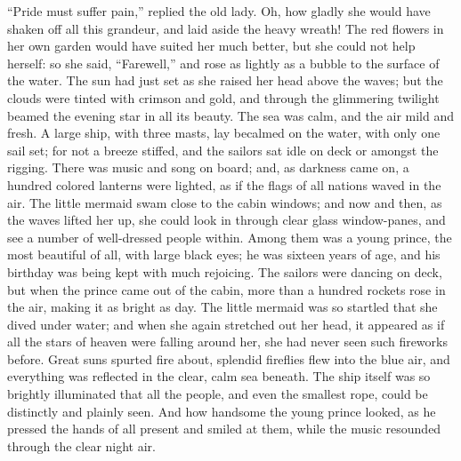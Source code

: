 ``Pride must suffer pain,'' replied the old lady.
Oh, how gladly she would have shaken off all this grandeur, and laid aside the heavy wreath! The red flowers in her own garden would have suited her much better, but she could not help herself: so she said, ``Farewell,'' and rose as lightly as a bubble to the surface of the water.
The sun had just set as she raised her head above the waves; but the clouds were tinted with crimson and gold, and through the glimmering twilight beamed the evening star in all its beauty.
The sea was calm, and the air mild and fresh.
A large ship, with three masts, lay becalmed on the water, with only one sail set; for not a breeze stiffed, and the sailors sat idle on deck or amongst the rigging.
There was music and song on board; and, as darkness came on, a hundred colored lanterns were lighted, as if the flags of all nations waved in the air.
The little mermaid swam close to the cabin windows; and now and then, as the waves lifted her up, she could look in through clear glass window-panes, and see a number of well-dressed people within.
Among them was a young prince, the most beautiful of all, with large black eyes; he was sixteen years of age, and his birthday was being kept with much rejoicing.
The sailors were dancing on deck, but when the prince came out of the cabin, more than a hundred rockets rose in the air, making it as bright as day.
The little mermaid was so startled that she dived under water; and when she again stretched out her head, it appeared as if all the stars of heaven were falling around her, she had never seen such fireworks before.
Great suns spurted fire about, splendid fireflies flew into the blue air, and everything was reflected in the clear, calm sea beneath.
The ship itself was so brightly illuminated that all the people, and even the smallest rope, could be distinctly and plainly seen.
And how handsome the young prince looked, as he pressed the hands of all present and smiled at them, while the music resounded through the clear night air.

